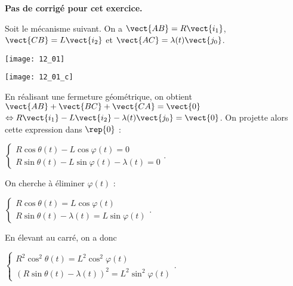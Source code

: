 \normaltrue \difficilefalse \tdifficilefalse
\correctiontrue


\setcounter{numques}{0}
\ifcorrection
\else
\textbf{Pas de corrigé pour cet exercice.}
\fi

\ifprof
\else
Soit le mécanisme suivant. On a $\vect{AB}=R\vect{i_1}$, $\vect{CB}=L\vect{i_2}$ et $\vect{AC}=\lambda(t) \vect{j_0}$. 

\begin{center}
\texttt{[image: 12\_01]}
\end{center}
\fi


\ifprof
\begin{center}
\texttt{[image: 12\_01\_c]}
\end{center}
\else
\fi


\ifprof
En réalisant une fermeture géométrique, on obtient 
$\vect{AB}+\vect{BC}+\vect{CA}=\vect{0}$ 
$ \Leftrightarrow R\vect{i_1} - L\vect{i_2} - \lambda(t) \vect{j_0} = \vect{0}$.
On projette alors cette expression dans $\rep{0}$ : 

$
\left\{
\begin{array}{l}
R\cos\theta(t)- L\cos\varphi(t) = 0 \\
R\sin\theta(t) - L\sin\varphi(t) - \lambda(t) = 0 
\end{array}
\right.
$.

On cherche à éliminer $\varphi(t)$ : 

$
\left\{
\begin{array}{l}
R\cos\theta(t) = L\cos\varphi(t)  \\
R\sin\theta(t)  - \lambda(t) = L\sin\varphi(t)
\end{array}
\right.
$.

En élevant au carré, on a donc 

$\left\{
\begin{array}{l}
R^2\cos^2\theta(t) = L^2\cos^2\varphi(t)  \\
\left(R\sin\theta(t)  - \lambda(t)\right)^2 = L^2\sin^2\varphi(t)
\end{array}
\right.
$.

